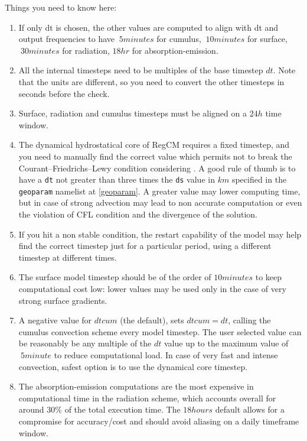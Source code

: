 Things you need to know here:

\begin{enumerate}
\item If only dt is chosen, the other values are computed to align with dt
and output frequencies to have $~5minutes$ for cumulus, $~10minutes$ for
surface, $~30 minutes$ for radiation, $18hr$ for absorption-emission.
\item All the internal timesteps need to be multiples of the base
timestep $dt$.  Note that the units are different, so you need to convert the
other timesteps in seconds before the check.
\item Surface, radiation and cumulus timesteps must be aligned on a $24h$
time window.
\item The dynamical hydrostatical core of RegCM requires a fixed timestep,
and you need to manually find the correct value which permits not to break
the Courant–Friedrichs–Lewy condition considering \cite{CFL}.
A good rule of thumb is to have a \verb=dt= not greater than three times
the \verb=ds= value in $km$ specified in the \verb=geoparam= namelist at
\ref{geoparam}.
A greater value may lower computing time, but in case of strong advection
may lead to non accurate computation or even the violation of CFL condition
and the divergence of the solution.
\item If you hit a non stable condition, the restart capability of the model
may help find the correct timestep just for a particular period, using a
different timestep at different times.
\item The surface model timestep should be of the order of $10 minutes$ to
keep computational cost low: lower values may be used only in the case of
very strong surface gradients.
\item A negative value for $dtcum$ (the default), sets $dtcum = dt$,
calling the cumulus convection scheme every model timestep. The user selected
value can be reasonably be any multiple of the $dt$ value up to the
maximum value of $~5minute$ to reduce computational load.
In case of very fast and intense convection, safest option is to use the
dynamical core timestep.
\item The absorption-emission computations are the most expensive in
computational time in the radiation scheme, which accounts overall for
around $30\%$ of the total execution time. The $18 hours$ default
allows for a compromise for accuracy/cost and should avoid aliasing on a
daily timeframe window.
\end{enumerate}

